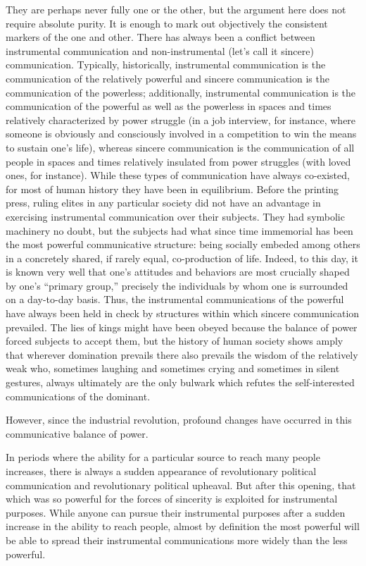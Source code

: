 \documentclass[12pt,book]{article}
\begin{document}
They are perhaps never fully one or the other, but the argument here
does not require absolute purity. It is enough to mark out objectively
the consistent markers of the one and other. There has always been a
conflict between instrumental communication and non-instrumental (let's
call it sincere) communication. Typically, historically, instrumental
communication is the communication of the relatively powerful and
sincere communication is the communication of the powerless;
additionally, instrumental communication is the communication of the
powerful as well as the powerless in spaces and times relatively
characterized by power struggle (in a job interview, for instance, where
someone is obviously and consciously involved in a competition to win
the means to sustain one's life), whereas sincere communication is the
communication of all people in spaces and times relatively insulated
from power struggles (with loved ones, for instance). While these types
of communication have always co-existed, for most of human history they
have been in equilibrium. Before the printing press, ruling elites in
any particular society did not have an advantage in exercising
instrumental communication over their subjects. They had symbolic
machinery no doubt, but the subjects had what since time immemorial has
been the most powerful communicative structure: being socially embeded
among others in a concretely shared, if rarely equal, co-production of
life. Indeed, to this day, it is known very well that one's attitudes
and behaviors are most crucially shaped by one's ``primary group,''
precisely the individuals by whom one is surrounded on a day-to-day
basis. Thus, the instrumental communications of the powerful have always
been held in check by structures within which sincere communication
prevailed. The lies of kings might have been obeyed because the balance
of power forced subjects to accept them, but the history of human
society shows amply that wherever domination prevails there also
prevails the wisdom of the relatively weak who, sometimes laughing and
sometimes crying and sometimes in silent gestures, always ultimately are
the only bulwark which refutes the self-interested communications of the
dominant.

However, since the industrial revolution, profound changes have occurred
in this communicative balance of power.

In periods where the ability for a particular source to reach many
people increases, there is always a sudden appearance of revolutionary
political communication and revolutionary political upheaval. But after
this opening, that which was so powerful for the forces of sincerity is
exploited for instrumental purposes. While anyone can pursue their
instrumental purposes after a sudden increase in the ability to reach
people, almost by definition the most powerful will be able to spread
their instrumental communications more widely than the less powerful.
\end{document}

